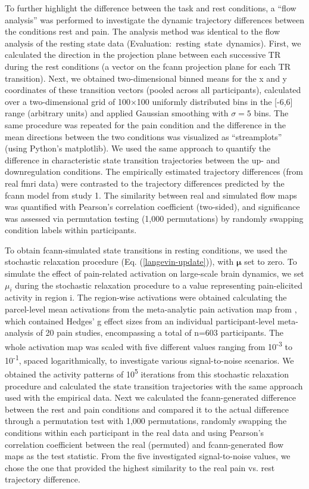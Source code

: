 \documentclass{article}
\begin{document}
To further highlight the difference between the task and rest conditions, a ``flow analysis'' was performed to investigate the dynamic trajectory differences between the conditions rest and pain. The analysis method was identical to the flow analysis of the resting state data (Evaluation:~resting~state~dynamics). First, we calculated the direction in the projection plane between each successive TR during the rest conditions (a vector on the \acrshort{fcann} projection plane for each TR transition). Next, we obtained two-dimensional binned means for the x and y coordinates of these transition vectors (pooled across all participants), calculated over a two-dimensional grid of 100$\times$100 uniformly distributed bins in the [-6,6] range (arbitrary units) and applied Gaussian smoothing with $\sigma=5$ bins.
The same procedure was repeated for the pain condition and the difference in the mean directions between the two conditions was visualized as ``streamplots'' (using Python's matplotlib). We used the same approach to quantify the difference in characteristic state transition trajectories between the up- and downregulation conditions. The empirically estimated trajectory differences (from real \acrshort{fmri} data) were contrasted to the trajectory differences predicted by the \acrshort{fcann} model from study 1. The similarity between real and simulated flow maps was quantified with Pearson's correlation coefficient (two-sided), and significance was assessed via permutation testing (1,000 permutations) by randomly swapping condition labels within participants.

To obtain \acrshort{fcann}-simulated state transitions in resting conditions, we used the stochastic relaxation procedure (Eq. (\ref{langevin-update})), with $\mathbf{\mu}$ set to zero.
To simulate the effect of pain-related activation on large-scale brain dynamics, we set $\mu_i$ during the stochastic relaxation procedure to a value representing pain-elicited activity in region i. The region-wise activations were obtained calculating the parcel-level mean activations from the meta-analytic pain activation map from \citep{zunhammer2021meta}, which contained Hedges' g effect sizes from an individual participant-level meta-analysis of 20 pain studies, encompassing a total of n=603 participants. The whole activation map was scaled with five different values ranging from 10\textsuperscript{-3} to 10\textsuperscript{-1}, spaced logarithmically, to investigate various signal-to-noise scenarios.
We obtained the activity patterns of 10\textsuperscript{5} iterations from this stochastic relaxation procedure and calculated the state transition trajectories with the same approach used with the empirical data.
Next we calculated the \acrshort{fcann}-generated difference between the rest and pain conditions and compared it to the actual difference through a permutation test with 1,000 permutations, randomly swapping the conditions within each participant in the real data and using Pearson's correlation coefficient between the real (permuted) and \acrshort{fcann}-generated flow maps as the test statistic.
From the five investigated signal-to-noise values, we chose the one that provided the highest similarity to the real pain vs. rest trajectory difference.
\end{document}
